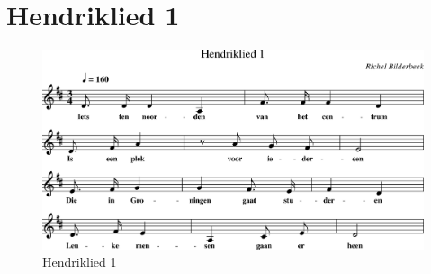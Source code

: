 \section{Hendriklied 1}



\begin{figure}[!htbp]
  \includegraphics[width=\textwidth,height=\textheight,keepaspectratio]{../songs/09_hendriklied_1.png}
  \caption{Hendriklied 1}
  \label{fig:09_hendriklied_1}
\end{figure}
